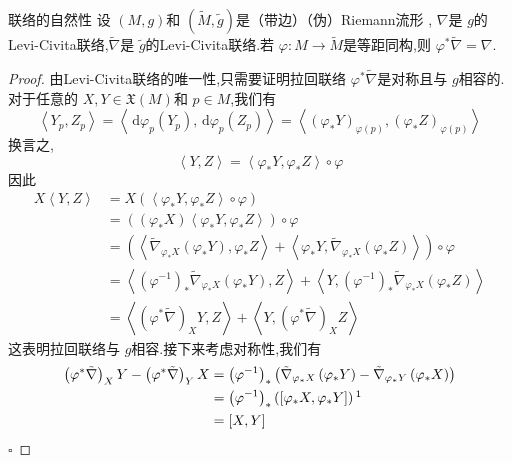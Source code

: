 \documentclass[../../几何与拓扑.tex]{subfiles}
\begin{document}
\begin{proposition}{联络的自然性}
    设 \(  \left( M,g \right)   \)和 \(  \left( \tilde{M},\tilde{g} \right)   \)是（带边）（伪）Riemann流形  , \(   \nabla   \)是 \(  g  \)的Levi-Civita联络,\(   \tilde{\nabla}   \)是 \(  \tilde{g}   \)的Levi-Civita联络.若 \(   \varphi :M\to \tilde{M}  \)是等距同构,则 \(   \varphi ^{*} \tilde{\nabla} =  \nabla   \).

    
\end{proposition}
\begin{proof}
    由Levi-Civita联络的唯一性,只需要证明拉回联络 \(   \varphi ^{*}  \tilde{\nabla}   \)是对称且与 \(  g  \)相容的.对于任意的 \(  X,Y \in \mathfrak{X}\left( M \right)   \)和 \(  p \in M  \),我们有 \[
    \left<Y_{p},Z_{p} \right>= \left<\,\mathrm{d}  \varphi _{p}\left( Y_{p} \right),\,\mathrm{d}  \varphi _{p} \left( Z_{p} \right)   \right>= \left<\left(  \varphi _{*}Y \right)_{ \varphi \left( p \right) },\left(  \varphi _{*}Z \right)_{ \varphi \left( p \right) }   \right>
    \]    换言之, \[
    \left<Y,Z \right>= \left< \varphi _{*}Y, \varphi _{*}Z \right>\circ  \varphi 
    \]因此 \[
    \begin{aligned}
    X\left<Y,Z \right>& =  X\left( \left< \varphi _{*}Y, \varphi _{*}Z \right>\circ  \varphi  \right)  \\ 
     & =  \left( \left(  \varphi _{*}X \right) \left< \varphi _{*}Y, \varphi _{*}Z \right> \right)\circ  \varphi \\ 
      & =  \left(\left< \tilde{\nabla} _{ \varphi _{*}X}\left(  \varphi _{*}Y \right), \varphi _{*}Z \right>+ \left< \varphi _{*}Y,  \tilde{\nabla} _{ \varphi _{*}X}\left(  \varphi _{*}Z \right)  \right>  \right)\circ  \varphi \\ 
       & =    \left<\left(  \varphi ^{-1}  \right)_{*}  \tilde{\nabla} _{ \varphi _{*}X}\left(  \varphi _{*}Y \right),Z   \right>+ \left<Y, \left(  \varphi ^{-1}  \right)_{*}  \tilde{\nabla} _{ \varphi _{*}X}\left(  \varphi _{*}Z \right)   \right>\\ 
        & =  \left< \left(  \varphi ^{*}  \tilde{\nabla}  \right)_{X}Y,Z \right>+ \left<Y, \left(  \varphi ^{*}  \tilde{\nabla}  \right)_{X}Z  \right>
    \end{aligned}
    \]这表明拉回联络与 \(  g  \)相容.接下来考虑对称性,我们有 \[
    \begin{aligned}
\left(  \varphi ^{*}  \tilde{\nabla}  \right)_{X}Y - \left(  \varphi ^{*}  \tilde{\nabla}  \right)_{Y}X& =  \left(  \varphi ^{-1}  \right)_{*}\left(  \tilde{\nabla} _{ \varphi _{*}X}\left(  \varphi _{*}Y \right) -   \tilde{\nabla} _{ \varphi _{*}Y}\left(  \varphi _{*}X \right)   \right)\\ 
 & = \left(  \varphi ^{-1}  \right)_{*}\left( \left[   \varphi _{*}X, \varphi _{*}Y \right]  \right)       \footnotemark\\ 
  & =  \left[ X,Y \right]  
    \end{aligned}
    \] 
    \hfill $\square$
\end{proof}
\end{document}

